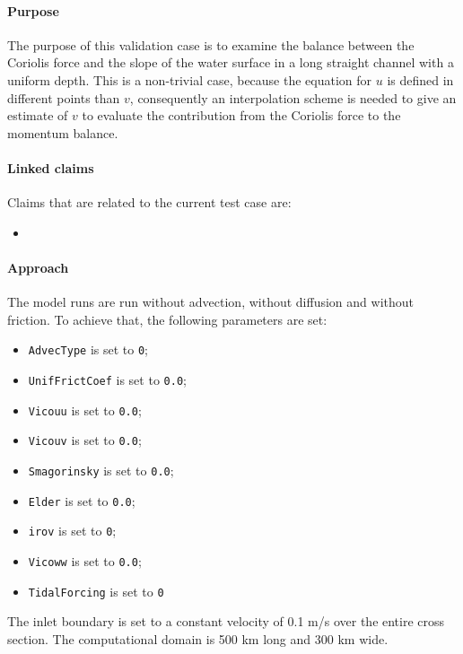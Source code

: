 

\paragraph*{Purpose}
The purpose of this validation case is to examine the balance between the Coriolis force and the slope of the water surface in a long straight channel with a uniform depth. This is a non-trivial case, because the equation for $u$ is defined in different points than $v$, consequently an interpolation scheme is needed to give an estimate of $v$ to evaluate the contribution from the Coriolis force to the momentum balance. 


\paragraph*{Linked claims}
Claims that are related to the current test case are:
\begin{itemize}
\item {}
\end{itemize}

\paragraph*{Approach}
The model runs are run without advection, without diffusion and without friction. To achieve that, the following parameters are set:
\begin{itemize}
\item \texttt{AdvecType} is set to \texttt{0};
\item \texttt{UnifFrictCoef} is set to \texttt{0.0};
\item \texttt{Vicouu} is set to \texttt{0.0};
\item \texttt{Vicouv} is set to \texttt{0.0};
\item \texttt{Smagorinsky} is set to \texttt{0.0};
\item \texttt{Elder} is set to \texttt{0.0};
\item \texttt{irov} is set to \texttt{0};
\item \texttt{Vicoww} is set to \texttt{0.0};
\item \texttt{TidalForcing} is set to \texttt{0}
\end{itemize}
The inlet boundary is set to a constant velocity of 0.1 m/s over the entire cross section. The computational domain is 500 km long and 300 km wide.

